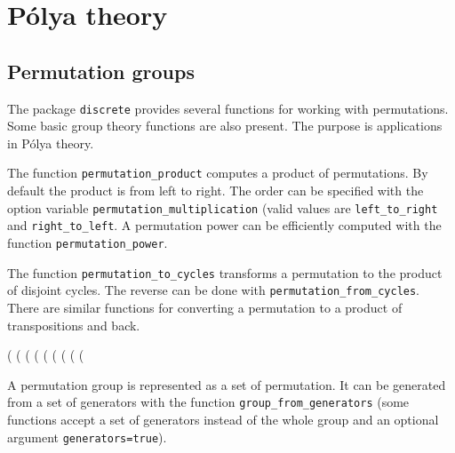 \documentclass[10pt]{article}
\newcommand{\command}[1]{\texttt{#1}}
\begin{document}
\section{P\'olya theory}

\subsection{Permutation groups}

The package \command{discrete} provides several functions for working
with permutations. Some basic group theory functions are also
present. The purpose is applications in P\'olya theory.

The function \command{permutation\_product} computes a product of
permutations. By default the product is from left to right.  The order
can be specified with the option variable
\command{permutation\_multiplication} (valid values are
\command{left\_to\_right} and \command{right\_to\_left}. A permutation
power can be efficiently computed with the function
\command{permutation\_power}.

The function \command{permutation\_to\_cycles} transforms a
permutation to the product of disjoint cycles. The reverse can be done
with \command{permutation\_from\_cycles}. There are similar functions
for converting a permutation to a product of transpositions and back.

\begin{example}
(%
(%
(%
(%
(%
(%
(%
(%
(%
\end{example}
%
A permutation group is represented as a set of permutation. It can be
generated from a set of generators with the function
\command{group\_from\_generators} (some functions accept a set of
generators instead of the whole group and an optional argument
\command{generators=true}).
\end{document}
